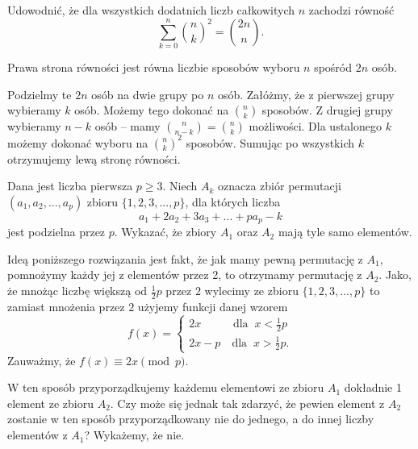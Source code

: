 \newpage

\begin{problem}{3} 
	Udowodnić, że dla wszystkich dodatnich liczb całkowitych $n$ zachodzi równość
	\[
	    \sum^{n}_{k=0} {{n}\choose{k}}^2 = {{2n}\choose{n}}.
	\]
\end{problem}

\vspace{5px}

\noindent
Prawa strona równości jest równa liczbie sposobów wyboru $n$ spośród $2n$ osób.
\vspace{10px}

\noindent
Podzielmy te $2n$ osób na dwie grupy po $n$ osób. Załóżmy, że z pierwszej grupy wybieramy $k$ osób. Możemy tego dokonać na ${n}\choose{k}$ sposobów. Z drugiej grupy wybieramy $n - k$ osób -- mamy ${{n}\choose{n - k}} = {{n}\choose{k}}$ możliwości. Dla ustalonego $k$ możemy dokonać wyboru na ${{n}\choose{k}}^2$ sposobów. Sumując po wszystkich $k$ otrzymujemy lewą stronę równości.

\begin{problem}{4}
	Dana jest liczba pierwsza $p \geqslant 3$. Niech $A_k$ oznacza zbiór permutacji $(a_1, a_2, ..., a_p)$ zbioru $\{1, 2, 3,..., p\}$, dla których liczba
	\[
		a_1 + 2a_2 + 3a_3 + ... + pa_p - k
	\]
	jest podzielna przez $p$. Wykazać, że zbiory $A_1$ oraz $A_2$ mają tyle samo elementów.
\end{problem}

\vspace{5px}

\noindent
Ideą poniższego rozwiązania jest fakt, że jak mamy pewną permutację z $A_1$, pomnożymy każdy jej z elementów przez 2, to otrzymamy permutację z $A_2$. Jako, że mnożąc liczbę większą od $\frac{1}{2}p$ przez $2$ wylecimy ze zbioru $\{1, 2, 3,..., p\}$ to zamiast mnożenia przez $2$ użyjemy funkcji danej wzorem
\[
	f(x) = 
	\begin{cases}
	2x \;\;\; \quad\quad\text{dla} \;\; x < \frac{1}{2}p\\
	2x - p \quad \text{dla} \;\; x > \frac{1}{2}p.
	\end{cases}
\]
Zauważmy, że $f(x) \equiv 2x \pmod{p}$.
\vspace{10px}

\noindent
W ten sposób przyporządkujemy każdemu elementowi ze zbioru $A_1$ dokładnie 1 element ze zbioru $A_2$. Czy może się jednak tak zdarzyć, że pewien element z $A_2$ zostanie w ten sposób przyporządkowany nie do jednego, a do innej liczby elementów z $A_1$? Wykażemy, że nie.
\vspace{10px}

